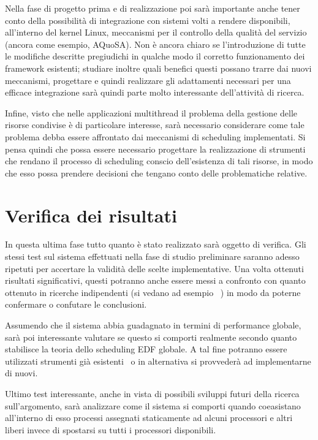 \documentclass[a4paper, 11pt, oneside]{article}
\begin{document}
Nella fase di progetto prima e di realizzazione poi sarà importante anche
tener conto della possibilità di integrazione con sistemi volti a rendere
disponibili, all'interno del kernel Linux, meccanismi per il controllo della
qualità del servizio (ancora come esempio, AQuoSA). Non è ancora chiaro se
l'introduzione di tutte le modifiche descritte pregiudichi in qualche modo
il corretto funzionamento dei framework esistenti; studiare inoltre quali
benefici questi possano trarre dai nuovi meccanismi, progettare e quindi
realizzare gli adattamenti necessari per una efficace integrazione sarà quindi
parte molto interessante dell'attività di ricerca. 

Infine, visto che nelle applicazioni multithread il problema della gestione
delle risorse condivise è di particolare interesse, sarà necessario considerare
come tale problema debba essere affrontato dai meccanismi di scheduling
implementati. Si pensa quindi che possa essere necessario progettare la
realizzazione di strumenti che rendano il processo di scheduling conscio
dell'esistenza di tali risorse, in modo che esso possa prendere decisioni
che tengano conto delle problematiche relative.

\section*{Verifica dei risultati}
In questa ultima fase tutto quanto è stato realizzato sarà oggetto di
verifica. Gli stessi test sul sistema effettuati nella fase di studio
preliminare saranno adesso ripetuti per accertare la validità delle scelte
implementative. Una volta ottenuti risultati significativi, questi potranno
anche essere messi a confronto con quanto ottenuto in ricerche indipendenti
(si vedano ad esempio~\cite{H-EDF, imp_global_sched, scalability_sched} )
in modo da poterne confermare o confutare le conclusioni.

Assumendo che il sistema abbia guadagnato in termini di performance globale,
sarà poi interessante valutare se questo si comporti realmente secondo quanto
stabilisce la teoria dello scheduling EDF globale. A tal fine potranno essere
utilizzati strumenti già esistenti~\cite{unit_trace} o in alternativa si
provvederà ad implementarne di nuovi.

Ultimo test interessante, anche in vista di possibili sviluppi futuri della
ricerca sull'argomento, sarà analizzare come il sistema si comporti quando
coeasistano all'interno di esso processi assegnati staticamente ad alcuni
processori e altri liberi invece di spostarsi su tutti i processori disponibili.



\end{document}
